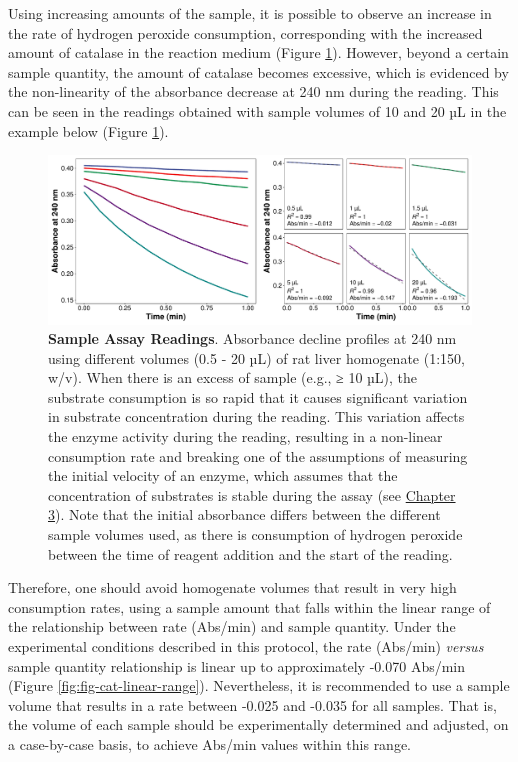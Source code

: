 \documentclass[
  9pt,
  american,
  a5paper,
  extrafontsizes,onecolumn,openright
  ]{memoir}
\begin{document}
\normalsize

Using increasing amounts of the sample, it is possible to observe an increase in the rate of hydrogen peroxide consumption, corresponding with the increased amount of catalase in the reaction medium (Figure \ref{fig:fig-cat-smp-vol-curves}). However, beyond a certain sample quantity, the amount of catalase becomes excessive, which is evidenced by the non-linearity of the absorbance decrease at 240 nm during the reading. This can be seen in the readings obtained with sample volumes of 10 and 20 µL in the example below (Figure \ref{fig:fig-cat-smp-vol-curves}).



\scriptsize

\begin{figure}

{\centering \includegraphics[width=1\linewidth]{Volume-1_files/figure-latex/fig-cat-smp-vol-curves-1} 

}

\caption{\textbf{Sample Assay Readings}. Absorbance decline profiles at 240 nm using different volumes (0.5 - 20 µL) of rat liver homogenate (1:150, w/v). When there is an excess of sample (e.g., ≥ 10 µL), the substrate consumption is so rapid that it causes significant variation in substrate concentration during the reading. This variation affects the enzyme activity during the reading, resulting in a non-linear consumption rate and breaking one of the assumptions of measuring the initial velocity of an enzyme, which assumes that the concentration of substrates is stable during the assay (see \hyperref[chapter3]{Chapter 3}). Note that the initial absorbance differs between the different sample volumes used, as there is consumption of hydrogen peroxide between the time of reagent addition and the start of the reading.}\label{fig:fig-cat-smp-vol-curves}
\end{figure}

\normalsize

Therefore, one should avoid homogenate volumes that result in very high consumption rates, using a sample amount that falls within the linear range of the relationship between rate (Abs/min) and sample quantity. Under the experimental conditions described in this protocol, the rate (Abs/min) \emph{versus} sample quantity relationship is linear up to approximately -0.070 Abs/min (Figure \ref{fig:fig-cat-linear-range}). Nevertheless, it is recommended to use a sample volume that results in a rate between -0.025 and -0.035 for all samples. That is, the volume of each sample should be experimentally determined and adjusted, on a case-by-case basis, to achieve Abs/min values within this range.
\end{document}
